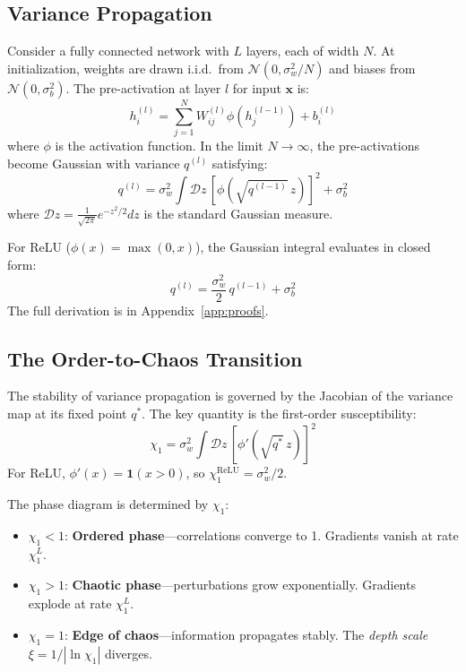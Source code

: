 \documentclass[10pt]{article}
\begin{document}
\subsection{Variance Propagation}

Consider a fully connected network with $L$ layers, each of width $N$.
At initialization, weights are drawn i.i.d.\ from $\mathcal{N}(0, \sigma_w^2/N)$ and biases from $\mathcal{N}(0, \sigma_b^2)$.
The pre-activation at layer $l$ for input $\mathbf{x}$ is:
\begin{equation}
    h_i^{(l)} = \sum_{j=1}^{N} W_{ij}^{(l)} \phi(h_j^{(l-1)}) + b_i^{(l)}
\end{equation}
where $\phi$ is the activation function.
In the limit $N \to \infty$, the pre-activations become Gaussian with variance $q^{(l)}$ satisfying:
\begin{equation}
    q^{(l)} = \sigma_w^2 \int \mathcal{D}z\, [\phi(\sqrt{q^{(l-1)}}\, z)]^2 + \sigma_b^2
    \label{eq:variance-map}
\end{equation}
where $\mathcal{D}z = \frac{1}{\sqrt{2\pi}} e^{-z^2/2} dz$ is the standard Gaussian measure.

For ReLU ($\phi(x) = \max(0,x)$), the Gaussian integral evaluates in closed form:
\begin{equation}
    q^{(l)} = \frac{\sigma_w^2}{2}\, q^{(l-1)} + \sigma_b^2
    \label{eq:relu-variance}
\end{equation}
The full derivation is in Appendix~\ref{app:proofs}.

\subsection{The Order-to-Chaos Transition}

The stability of variance propagation is governed by the Jacobian of the variance map at its fixed point $q^*$.
The key quantity is the first-order susceptibility:
\begin{equation}
    \chi_1 = \sigma_w^2 \int \mathcal{D}z\, [\phi'(\sqrt{q^*}\, z)]^2
    \label{eq:chi1}
\end{equation}
For ReLU, $\phi'(x) = \mathbf{1}(x > 0)$, so $\chi_1^{\text{ReLU}} = \sigma_w^2/2$.

The phase diagram is determined by $\chi_1$:
\begin{itemize}[nosep]
    \item $\chi_1 < 1$: \textbf{Ordered phase}---correlations converge to 1. Gradients vanish at rate $\chi_1^L$.
    \item $\chi_1 > 1$: \textbf{Chaotic phase}---perturbations grow exponentially. Gradients explode at rate $\chi_1^L$.
    \item $\chi_1 = 1$: \textbf{Edge of chaos}---information propagates stably. The \emph{depth scale} $\xi = 1/|\ln \chi_1|$ diverges.
\end{itemize}
\end{document}
